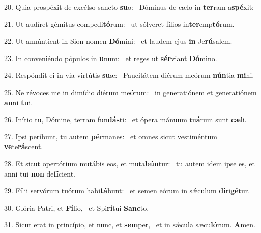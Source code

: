 20. Quia prospéxit de excélso sancto \textbf{su}o: \ast\  Dóminus de cælo in \textbf{ter}ram a\textbf{spé}xit:\

21. Ut audíret gémitus compedi\textbf{tó}rum: \ast\  ut sólveret fílios in\textbf{ter}emp\textbf{tó}rum.\

22. Ut annúntient in Sion nomen \textbf{Dó}mini: \ast\  et laudem ejus \textbf{in} Je\textbf{rú}salem.\

23. In conveniéndo pópulos in \textbf{u}num: \ast\  et reges ut \textbf{sér}viant \textbf{Dó}mino.\

24. Respóndit ei in via virtútis \textbf{su}æ: \ast\  Paucitátem diérum meórum \textbf{nún}tia \textbf{mi}hi.\

25. Ne révoces me in dimídio diérum me\textbf{ó}rum: \ast\  in generatiónem et generatiónem \textbf{an}ni \textbf{tu}i.\

26. Inítio tu, Dómine, terram fun\textbf{dás}ti: \ast\  et ópera mánuum tu\textbf{á}rum sunt \textbf{cæ}li.\

27. Ipsi períbunt, tu autem \textbf{pér}manes: \ast\  et omnes sicut vestiméntum \textbf{ve}te\textbf{rá}scent.\

28. Et sicut opertórium mutábis eos, et muta\textbf{bún}tur: \ast\  tu autem idem ipse es, et anni tui \textbf{non} de\textbf{fí}cient.\

29. Fílii servórum tuórum habi\textbf{tá}bunt: \ast\  et semen eórum in sǽculum \textbf{di}ri\textbf{gé}tur.\

30. Glória Patri, et \textbf{Fí}lio, \ast\  et Spi\textbf{rí}tui \textbf{Sanc}to.\

31. Sicut erat in princípio, et nunc, et \textbf{sem}per, \ast\  et in sǽcula sæcu\textbf{ló}rum. \textbf{A}men.\

